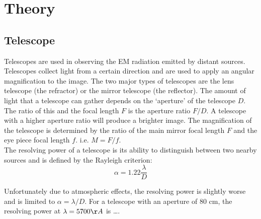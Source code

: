 \documentclass[12pt,a4paper]{article}
\begin{document}
\section{Theory}\label{sec:theory}
\subsection{Telescope}
  Telescopes are used in observing the EM radiation emitted by distant sources. Telescopes collect light from a certain direction and are used to apply an angular magnification to the image. The two major types of telescopes are 
  the lens telescope (the refractor) or the mirror telescope (the reflector). The amount of light that a telescope can gather depends on the `aperture' of the telescope $D$. The ratio of this and the focal length
  $F$ is the aperture ratio $F/D$. A telescope with a higher aperture ratio will produce a brighter image. The magnification of the telescope is determined by the ratio of the main mirror focal length $F$ and the eye piece focal length
  $f$. i.e. $M = F/f$. 
  \\
  The resolving power of a telescope is its ability to distinguish between two nearby sources and is defined by the Rayleigh criterion:
  \begin{equation}
    \alpha = 1.22 \frac{\lambda}{D}
  \end{equation}

  Unfortunately due to atmospheric effects, the resolving power is slightly worse and is limited to $\alpha = \lambda/D$. For a telescope with an aperture of 80 cm, the resolving power
  at $\lambda = 5700 \AA$  is \dots.
\end{document}
